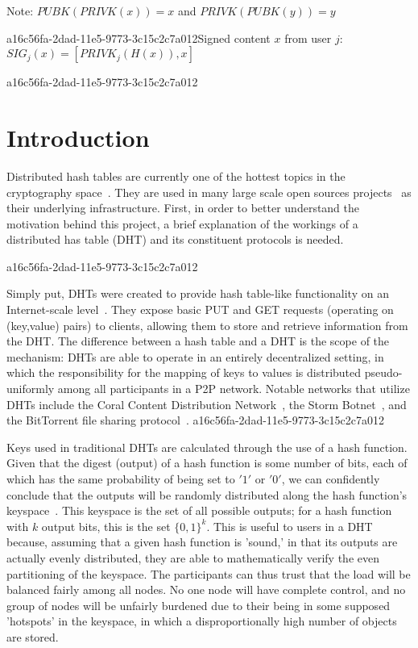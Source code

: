 \documentclass[12pt]{article}
\begin{document}
Note: $PUBK(PRIVK(x)) = x$ and $PRIVK(PUBK(y)) = y$~

a16c56fa-2dad-11e5-9773-3c15c2c7a012Signed content $x$ from user $j$: $SIG_j(x) = \left[ PRIVK_j( H(x) ), x \right]$

a16c56fa-2dad-11e5-9773-3c15c2c7a012\section{Introduction}
\par Distributed hash tables are currently one of the hottest topics in the cryptography space~\cite{Stoica:2001dj,Rowstron:2001ea,Ratnasamy:2001wn}. They are used in many large scale open sources projects~\cite{Freitas:2013tb,Xu:2010vs,Perfitt:2010fh} as their underlying infrastructure. First, in order to better understand the motivation behind this project, a brief explanation of the workings of a distributed has table (DHT) and its constituent protocols is needed.

a16c56fa-2dad-11e5-9773-3c15c2c7a012\par Simply put, DHTs were created to provide hash table-like functionality on an Internet-scale level~\cite{Ratnasamy:2001wn}. They expose basic PUT and GET requests (operating on (key,value) pairs) to clients, allowing them to store and retrieve information from the DHT. The difference between a hash table and a DHT is the scope of the mechanism: DHTs are able to operate in an entirely decentralized setting, in which the responsibility for the mapping of keys to values is distributed pseudo-uniformly among all participants in a P2P network. Notable networks that utilize DHTs include the Coral Content Distribution Network~\cite{Freedman:2004vb}, the Storm Botnet~\cite{Holz:2008uk}, and the BitTorrent file sharing protocol~\cite{Cohen:y1_8mBnw}.
a16c56fa-2dad-11e5-9773-3c15c2c7a012
\par Keys used in traditional DHTs are calculated through the use of a hash function. Given that the digest (output) of a hash function is some number of bits, each of which has the same probability of being set to $'1'$ or $'0'$, we can confidently conclude that the outputs will be randomly distributed along the hash function's keyspace~. This keyspace is the set of all possible outputs; for a hash function with $k$ output bits, this is the set $\{0,1\}^k$. This is useful to users in a DHT because, assuming that a given hash function is 'sound,' in that its outputs are actually evenly distributed, they are able to mathematically verify the even partitioning of the keyspace. The participants can thus trust that the load will be balanced fairly among all nodes. No one node will have complete control, and no group of nodes will be unfairly burdened due to their being in some supposed 'hotspots' in the keyspace, in which a disproportionally high number of objects are stored.~
\end{document}
